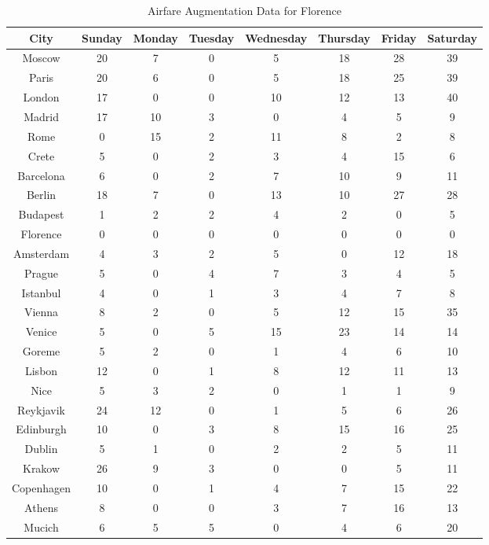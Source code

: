\documentclass[12pt]{article}
\begin{document}
\pagebreak
\begin{table}[h]
\caption{Airfare Augmentation Data for Florence}
\centering
\vspace{1mm}
\begin{tabular}{c|c|c|c|c|c|c|c}
\hline
\rule{0pt}{2ex} City & Sunday & Monday & Tuesday & Wednesday & Thursday & Friday & Saturday \\
\hline
\rule{0pt}{2ex}Moscow & 20 & 7 & 0 & 5 & 18 & 28 & 39 \\
Paris & 20 & 6 & 0 & 5 & 18 & 25 & 39 \\
London & 17 & 0 & 0 & 10 & 12 & 13 & 40 \\
Madrid & 17 & 10 & 3 & 0 & 4 & 5 & 9 \\
Rome & 0 & 15 & 2 & 11 & 8 & 2 & 8 \\
Crete & 5 & 0 & 2 & 3 & 4 & 15 & 6 \\
Barcelona & 6 & 0 & 2 & 7 & 10 & 9 & 11 \\
Berlin & 18 & 7 & 0 & 13 & 10 & 27 & 28 \\
Budapest & 1 & 2 & 2 & 4 & 2 & 0 & 5 \\
Florence & 0 & 0 & 0 & 0 & 0 & 0 & 0 \\
Amsterdam & 4 & 3 & 2 & 5 & 0 & 12 & 18 \\
Prague & 5 & 0 & 4 & 7 & 3 & 4 & 5 \\
Istanbul & 4 & 0 & 1 & 3 & 4 & 7 & 8 \\
Vienna & 8 & 2 & 0 & 5 & 12 & 15 & 35 \\
Venice & 5 & 0 & 5 & 15 & 23 & 14 & 14 \\
Goreme & 5 & 2 & 0 & 1 & 4 & 6 & 10 \\
Lisbon & 12 & 0 & 1 & 8 & 12 & 11 & 13 \\
Nice & 5 & 3 & 2 & 0 & 1 & 1 & 9 \\
Reykjavik & 24 & 12 & 0 & 1 & 5 & 6 & 26 \\
Edinburgh & 10 & 0 & 3 & 8 & 15 & 16 & 25 \\
Dublin & 5 & 1 & 0 & 2 & 2 & 5 & 11 \\
Krakow & 26 & 9 & 3 & 0 & 0 & 5 & 11 \\
Copenhagen & 10 & 0 & 1 & 4 & 7 & 15 & 22 \\
Athens & 8 & 0 & 0 & 3 & 7 & 16 & 13 \\
Mucich & 6 & 5 & 5 & 0 & 4 & 6 & 20 \\

\end{tabular}
\end{table}
\end{document}
